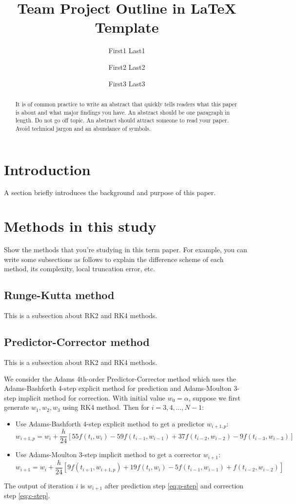 \documentclass[11pt]{article}	%
\title{Team Project Outline in LaTeX Template}
\author{First1 Last1 \and First2 Last2 \and First3 Last3}
\date{} %
\begin{document}
\maketitle

\begin{abstract}
It is of common practice to write an abstract that quickly tells readers what
this paper is about and what major findings you have.
An abstract should be one paragraph in length.
Do not go off topic. An abstract should attract someone to read your
paper. Avoid technical jargon and an abundance of symbols.
\end{abstract}

\section{Introduction}
A section briefly introduces the background and purpose of this paper.

\section{Methods in this study}
Show the methods that you're studying in this term paper.
For example, you can write some subsections as follows to
explain the difference scheme of each method, its complexity, local truncation error, etc.

\subsection{Runge-Kutta method}
This is a subsection about RK2 and RK4 methods.

\subsection{Predictor-Corrector method}
This is a subsection about RK2 and RK4 methods.

We consider the Adams 4th-order Predictor-Corrector method
which uses the Adams-Bashforth 4-step explicit method for prediction and Adams-Moulton 3-step implicit
method for correction. With initial value $w_0=\alpha$, suppose we first generate $w_1,w_2,w_3$
using RK4 method. Then for $i=3,4,\dots,N-1$:
\begin{itemize}
\item Use Adams-Bashforth 4-step explicit method to get a predictor $w_{i+1,p}$:
\begin{equation}\label{eq:p-step}
w_{i+1,p} = w_i + \frac{h}{24} [ 55 f(t_i, w_i) - 59 f(t_{i-1}, w_{i-1}) + 37 f(t_{i-2}, w_{i-2}) - 9 f(t_{i-3},w_{i-3}) ]
\end{equation}
\item Use Adams-Moulton 3-step implicit method to get a corrector $w_{i+1}$:
\begin{equation}\label{eq:c-step}
w_{i+1} = w_i + \frac{h}{24} [ 9 f(t_{i+1},w_{i+1,p}) + 19 f(t_i, w_i) - 5 f(t_{i-1}, w_{i-1}) + f(t_{i-2}, w_{i-2}) ]
\end{equation}
\end{itemize}
The output of iteration $i$ is $w_{i+1}$ after prediction step \eqref{eq:p-step} and correction step \eqref{eq:c-step}.
\end{document}
